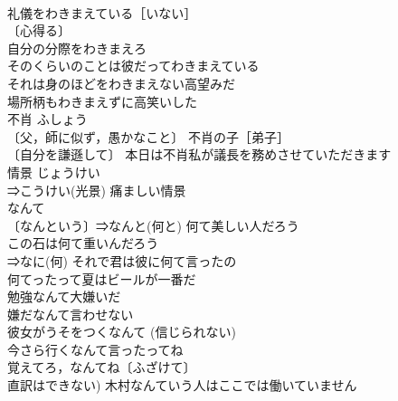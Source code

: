 \documentclass[8pt]{extreport}
\begin{document}
\begin{CJK}{UTF8}{min}
\\	礼儀をわきまえている［いない］ 
\\	〔心得る〕
\\	自分の分際をわきまえろ 
\\	そのくらいのことは彼だってわきまえている 
\\	それは身のほどをわきまえない高望みだ 
\\	場所柄もわきまえずに高笑いした 
\\	不肖	ふしょう	
\\	〔父，師に似ず，愚かなこと〕 不肖の子［弟子］ 
\\	〔自分を謙遜して〕 本日は不肖私が議長を務めさせていただきます 
\\	情景	じょうけい	
\\	⇒こうけい(光景) 痛ましい情景 
\\	なんて		
\\	〔なんという〕⇒なんと(何と) 何て美しい人だろう 
\\	この石は何て重いんだろう 
\\	⇒なに(何) それで君は彼に何て言ったの 
\\	何てったって夏はビールが一番だ 
\\	勉強なんて大嫌いだ 
\\	嫌だなんて言わせない 
\\	彼女がうそをつくなんて (信じられない) 
\\	今さら行くなんて言ったってね 
\\	覚えてろ，なんてね〔ふざけて〕 
\\	直訳はできない) 木村なんていう人はここでは働いていません 
\end{CJK}
\end{document}
